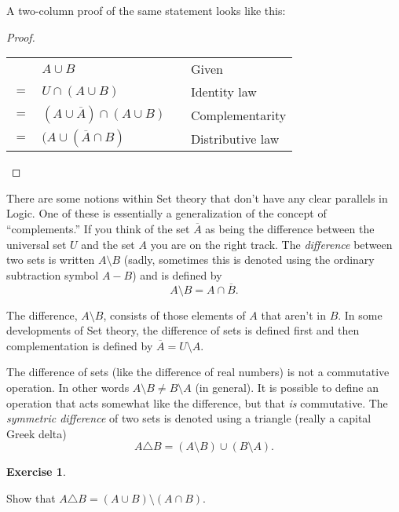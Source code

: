 \documentclass[10pt,]{book}
\theoremstyle{plain}
\theoremstyle{definition}
\theoremstyle{definition}
\newtheorem{exercise}[theorem]{Exercise}
\numberwithin{equation}{section}
\begin{document}
    A two-column proof of the same statement looks like this:
\begin{proof}\hypertarget{proof-24}{}
\begin{tabular}{llll}
&\(A \cup B\)&&Given\tabularnewline[0pt]
\(=\)&\(U \cap (A \cup B)\)&&Identity law\tabularnewline[0pt]
\(=\)&\((A \cup \overline{A}) \cap (A \cup B)\)&&Complementarity\tabularnewline[0pt]
\(=\)&\((A \cup (\overline{A} \cap B)\)&&Distributive law
\end{tabular}
\end{proof}
\par

    There are some notions within Set theory that don't have any clear
    parallels in Logic. One of these is essentially a generalization
    of the concept of ``complements.'' If you think of the set \(\overline{A}\)
    as being the difference between the universal set \(U\) and the set \(A\)
    you are on the right track. The
    \emph{difference} between two sets is written
    \(A \setminus B\) (sadly, sometimes this is denoted using the ordinary
    subtraction symbol \(A-B\)) and is defined by
    \begin{equation*}
      A \setminus B = A \cap \overline{B}.
    \end{equation*}
\par

    The difference, \(A \setminus B\), consists of those elements of \(A\) that aren't in \(B\). In some developments of Set theory, the difference of sets is
    defined first and then complementation is defined by \(\overline{A} = U \setminus A\).
\par

    The difference of sets (like the difference of real numbers) is not a
    commutative operation. In other words \(A \setminus B \neq B \setminus A\)
    (in general). It is possible to define an operation that acts somewhat
    like the difference, but that \emph{is} commutative. The
    \emph{symmetric difference}
    of two sets is denoted using a
    triangle (really a capital Greek delta)
    \begin{equation*}
      A \triangle B = (A \setminus B) \cup (B\setminus A).
    \end{equation*}
\begin{exercise}\label{exercise-39}

        Show that \(A \triangle B = (A \cup B) \setminus (A \cap B)\).
\end{exercise}
\par
\end{document}
